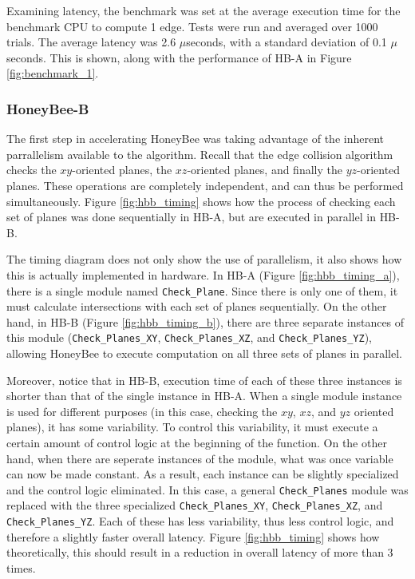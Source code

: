         Examining latency, the benchmark was set at the average execution time for the benchmark CPU to compute 1 edge. Tests were run and averaged over 1000 trials. The average latency was 2.6 $\mu$seconds, with a standard deviation of 0.1 $\mu$seconds. This is shown, along with the performance of \gls{HB-A} in Figure \ref{fig:benchmark_1}.

        

    \subsubsection{HoneyBee-B}
        The first step in accelerating HoneyBee was taking advantage of the inherent parrallelism available to the algorithm. Recall that the edge collision algorithm checks the $xy$-oriented planes, the $xz$-oriented planes, and finally the $yz$-oriented planes. These operations are completely independent, and can thus be performed simultaneously. Figure \ref{fig:hbb_timing} shows how the process of checking each set of planes was done sequentially in \gls{HB-A}, but are executed in parallel in \gls{HB-B}.

        

        The timing diagram does not only show the use of parallelism, it also shows how this is actually implemented in hardware. In \gls{HB-A} (Figure \ref{fig:hbb_timing_a}), there is a single module named \texttt{Check\_Plane}. Since there is only one of them, it must calculate intersections with each set of planes sequentially. On the other hand, in \gls{HB-B} (Figure \ref{fig:hbb_timing_b}), there are three separate instances of this module (\texttt{Check\_Planes\_XY}, \texttt{Check\_Planes\_XZ}, and \texttt{Check\_Planes\_YZ}), allowing HoneyBee to execute computation on all three sets of planes in parallel. 

        Moreover, notice that in \gls{HB-B}, execution time of each of these three instances is shorter than that of the single instance in \gls{HB-A}. When a single module instance is used for different purposes (in this case, checking the $xy$, $xz$, and $yz$ oriented planes), it has some variability. To control this variability, it must execute a certain amount of control logic at the beginning of the function. On the other hand, when there are seperate instances of the module, what was once variable can now be made constant. As a result, each instance can be slightly specialized and the control logic eliminated. In this case, a general \texttt{Check\_Planes} module was replaced with the three specialized \texttt{Check\_Planes\_XY}, \texttt{Check\_Planes\_XZ}, and \texttt{Check\_Planes\_YZ}. Each of these has less variability, thus less control logic, and therefore a slightly faster overall latency. Figure \ref{fig:hbb_timing} shows how theoretically, this should result in a reduction in overall latency of more than 3 times.\\

